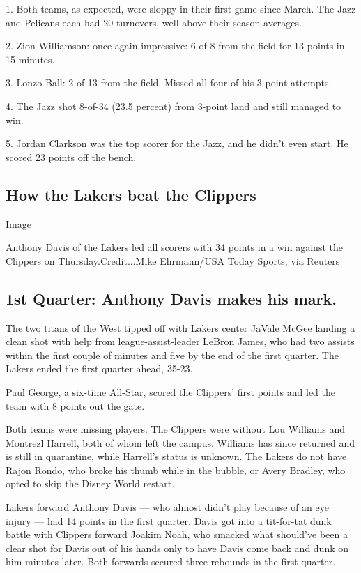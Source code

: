 1. Both teams, as expected, were sloppy in their first game since March.
The Jazz and Pelicans each had 20 turnovers, well above their season
averages.

2. Zion Williamson: once again impressive: 6-of-8 from the field for 13
points in 15 minutes.

3. Lonzo Ball: 2-of-13 from the field. Missed all four of his 3-point
attempts.

4. The Jazz shot 8-of-34 (23.5 percent) from 3-point land and still
managed to win.

5. Jordan Clarkson was the top scorer for the Jazz, and he didn't even
start. He scored 23 points off the bench.

\hypertarget{how-the-lakers-beat-the-clippers}{%
\subsection{How the Lakers beat the
Clippers}\label{how-the-lakers-beat-the-clippers}}

Image

Anthony Davis of the Lakers led all scorers with 34 points in a win
against the Clippers on Thursday.Credit...Mike Ehrmann/USA Today Sports,
via Reuters

\hypertarget{1st-quarter-anthony-davis-makes-his-mark}{%
\subsection{1st Quarter: Anthony Davis makes his
mark.}\label{1st-quarter-anthony-davis-makes-his-mark}}

The two titans of the West tipped off with Lakers center JaVale McGee
landing a clean shot with help from league-assist-leader LeBron James,
who had two assists within the first couple of minutes and five by the
end of the first quarter. The Lakers ended the first quarter ahead,
35-23.

Paul George, a six-time All-Star, scored the Clippers' first points and
led the team with 8 points out the gate.

Both teams were missing players. The Clippers were without Lou Williams
and Montrezl Harrell, both of whom left the campus. Williams has since
returned and is still in quarantine, while Harrell's status is unknown.
The Lakers do not have Rajon Rondo, who broke his thumb while in the
bubble, or Avery Bradley, who opted to skip the Disney World restart.

Lakers forward Anthony Davis --- who almost didn't play because of an
eye injury --- had 14 points in the first quarter. Davis got into a
tit-for-tat dunk battle with Clippers forward Joakim Noah, who smacked
what should've been a clear shot for Davis out of his hands only to have
Davis come back and dunk on him minutes later. Both forwards secured
three rebounds in the first quarter.

